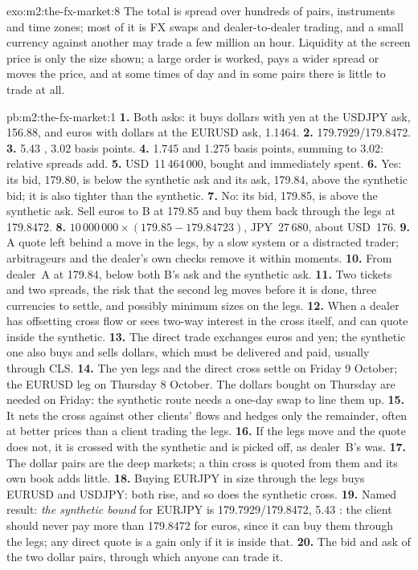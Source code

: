 \begin{solution}{exo:m2:the-fx-market:8}
The total is spread over hundreds of pairs, instruments and time zones; most of
it is FX swaps and dealer-to-dealer trading, and a small currency against another
may trade a few million an hour. Liquidity at the screen price is only the
size shown; a large order is worked, pays a wider spread or moves the price,
and at some times of day and in some pairs there is little to trade at all.
\end{solution}

\begin{solution}{pb:m2:the-fx-market:1}
\textbf{1.} Both asks: it buys dollars with yen at the USDJPY ask, 156.88, and
euros with dollars at the EURUSD ask, 1.1464.
\textbf{2.} 179.7929/179.8472.
\textbf{3.} 5.43 , 3.02 basis points.
\textbf{4.} 1.745 and 1.275 basis points, summing to 3.02: relative spreads add.
\textbf{5.} USD~11\,464\,000, bought and immediately spent.
\textbf{6.} Yes: its bid, 179.80, is below the synthetic ask and its ask, 179.84,
above the synthetic bid; it is also tighter than the synthetic.
\textbf{7.} No: its bid, 179.85, is above the synthetic ask. Sell euros to B at
179.85 and buy them back through the legs at 179.8472.
\textbf{8.} $10\,000\,000 \times (179.85 - 179.84723)$, JPY~27\,680, about USD~176.
\textbf{9.} A quote left behind a move in the legs, by a slow system or a
distracted trader; arbitrageurs and the dealer's own checks remove it within
moments.
\textbf{10.} From dealer~A at 179.84, below both B's ask and the synthetic ask.
\textbf{11.} Two tickets and two spreads, the risk that the second leg moves
before it is done, three currencies to settle, and possibly minimum sizes on the
legs.
\textbf{12.} When a dealer has offsetting cross flow or sees two-way interest in
the cross itself, and can quote inside the synthetic.
\textbf{13.} The direct trade exchanges euros and yen; the synthetic one also
buys and sells dollars, which must be delivered and paid, usually through CLS.
\textbf{14.} The yen legs and the direct cross settle on Friday 9 October; the
EURUSD leg on Thursday 8 October. The dollars bought on Thursday are needed on
Friday: the synthetic route needs a one-day swap to line them up.
\textbf{15.} It nets the cross against other clients' flows and hedges only the
remainder, often at better prices than a client trading the legs.
\textbf{16.} If the legs move and the quote does not, it is crossed with the
synthetic and is picked off, as dealer~B's was.
\textbf{17.} The dollar pairs are the deep markets; a thin cross is quoted from
them and its own book adds little.
\textbf{18.} Buying EURJPY in size through the legs buys EURUSD and USDJPY:
both rise, and so does the synthetic cross.
\textbf{19.} Named result: \emph{the synthetic bound} for EURJPY is
179.7929/179.8472, 5.43 : the client should never pay more than 179.8472 for
euros, since it can buy them through the legs; any direct quote is a gain only if
it is inside that.
\textbf{20.} The bid and ask of the two dollar pairs, through which anyone can
trade it.
\end{solution}

